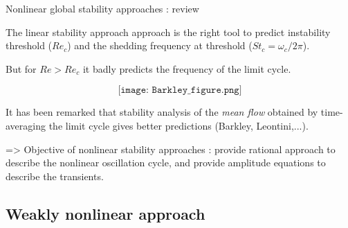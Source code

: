 \documentclass{beamer}
\newcommand{\ssp}{\vspace{.2cm} }
\begin{document}

\begin{frame}{Nonlinear global stability approaches : review}
\small

The linear stability approach approach is the right tool to predict instability threshold ($Re_c$) and the shedding frequency at threshold ($St_c = \omega_c/2\pi$).

\ssp
 But for $Re>Re_c$ it badly predicts the frequency of the limit cycle. 
 
$$
\texttt{[image: Barkley\_figure.png]}
$$

 
 
 \ssp It has been remarked that stability analysis of the {\em mean flow} obtained by time-averaging the limit cycle gives better predictions (Barkley, Leontini,...).
  
  
\ssp 

  
  => Objective of nonlinear stability approaches : provide rational approach to describe the nonlinear oscillation cycle,
  and provide amplitude equations to describe the transients.
  
  
  

\end{frame}
\subsection{Weakly nonlinear approach}
\end{document}
